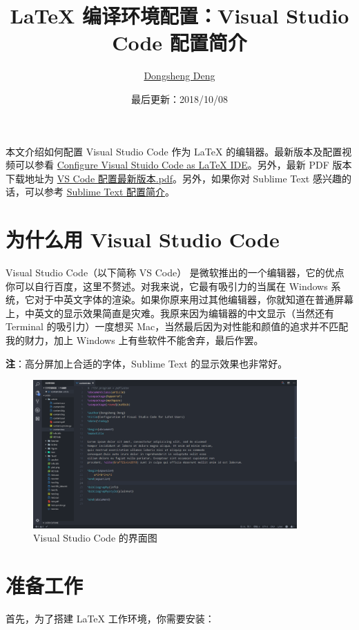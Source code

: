 \documentclass{article}
\title{\bfseries LaTeX 编译环境配置：Visual Studio Code 配置简介}
\author{\href{https://ddswhu.me/}{Dongsheng Deng}}
\date{最后更新：2018/10/08}
\begin{document}
\maketitle

本文介绍如何配置 Visual Studio Code 作为 LaTeX 的编辑器。最新版本及配置视频可以参看 \href{https://ddswhu.me/posts/2018-04/vs-code-for-latex/}{Configure Visual Stuido Code as LaTeX IDE}。另外，最新 PDF 版本下载地址为 \href{https://ddswhu.me/posts/archive/vscode.pdf}{VS Code 配置最新版本.pdf}。另外，如果你对 Sublime Text 感兴趣的话，可以参考 \href{https://ddswhu.me/posts/2018-06/sublime-text-for-latex/}{Sublime Text 配置简介}。

\section{为什么用 Visual Studio Code}
Visual Studio Code（以下简称 VS Code） 是微软推出的一个编辑器，它的优点你可以自行百度，这里不赘述。对我来说，它最有吸引力的当属在 Windows 系统，它对于中英文字体的渲染。如果你原来用过其他编辑器，你就知道在普通屏幕上，中英文的显示效果简直是灾难。我原来因为编辑器的中文显示（当然还有 Terminal 的吸引力）一度想买 Mac，当然最后因为对性能和颜值的追求并不匹配我的财力，加上 Windows 上有些软件不能舍弃，最后作罢。

\textbf{注}：高分屏加上合适的字体，Sublime Text 的显示效果也非常好。

\begin{figure}[htbp]
    \centering
    \includegraphics[width=0.9\textwidth]{vscode.png}
    \caption{Visual Studio Code 的界面图}
    \label{fig:vscode}
\end{figure}



\section{准备工作}
首先，为了搭建 LaTeX 工作环境，你需要安装：
\end{document}
